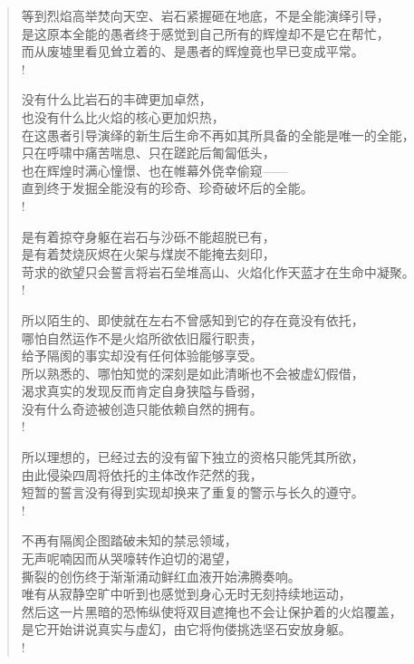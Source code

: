 \documentclass[UTF8, 12pt, a4paper]{ctexrep} %
\begin{document}
\begin{verse}
等到烈焰高举焚向天空、岩石紧握砸在地底，不是全能演绎引导，\\
是这原本全能的愚者终于感觉到自己所有的辉煌却不是它在帮忙，\\
而从废墟里看见耸立着的、是愚者的辉煌竟也早已变成平常。\\!

没有什么比岩石的丰碑更加卓然，\\
也没有什么比火焰的核心更加炽热，\\
在这愚者引导演绎的新生后生命不再如其所具备的全能是唯一的全能，\\
只在呼啸中痛苦喘息、只在蹉跎后匍匐低头，\\
也在辉煌时满心憧憬、也在帷幕外侥幸偷窥——\\
直到终于发掘全能没有的珍奇、珍奇破坏后的全能。\\!

是有着掠夺身躯在岩石与沙砾不能超脱已有，\\
是有着焚烧灰烬在火架与煤炭不能掩去刻印，\\
苛求的欲望只会誓言将岩石垒堆高山、火焰化作天蓝才在生命中凝聚。\\!

所以陌生的、即使就在左右不曾感知到它的存在竟没有依托，\\
哪怕自然运作不是火焰所欲依旧履行职责，\\
给予隔阂的事实却没有任何体验能够享受。\\
所以熟悉的、哪怕知觉的深刻是如此清晰也不会被虚幻假借，\\
渴求真实的发现反而肯定自身狭隘与昏弱，\\
没有什么奇迹被创造只能依赖自然的拥有。\\!

所以理想的，已经过去的没有留下独立的资格只能凭其所欲，\\
由此侵染四周将依托的主体改作茫然的我，\\
短暂的誓言没有得到实现却换来了重复的警示与长久的遵守。\\!

不再有隔阂企图踏破未知的禁忌领域，\\
无声呢喃因而从哭嚎转作迫切的渴望，\\
撕裂的创伤终于渐渐涌动鲜红血液开始沸腾奏响。\\
唯有从寂静空旷中听到也感觉到身心无时无刻持续地运动，\\
然后这一片黑暗的恐怖纵使将双目遮掩也不会让保护着的火焰覆盖，\\
是它开始讲说真实与虚幻，由它将佝偻挑选坚石安放身躯。\\!


\end{verse}
\end{document}
